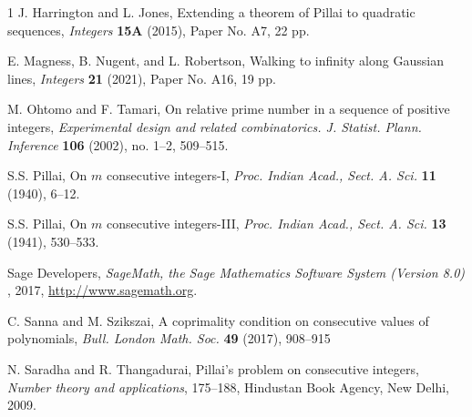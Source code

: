 \documentclass[11pt]{article}
\begin{document}
\begin{thebibliography}{1}
 J. Harrington and L. Jones, Extending a theorem of Pillai to quadratic sequences, {\em Integers} {\textbf{15A}} (2015), Paper No. A7, 22 pp.

 E. Magness, B. Nugent, and L. Robertson, 
Walking to infinity along Gaussian lines,
{\em Integers} {\textbf{21}} (2021), Paper No. A16, 19 pp.

 M. Ohtomo and F. Tamari, On relative prime number in a sequence of positive integers, {\em Experimental design and related combinatorics. J. Statist. Plann. Inference} {\textbf{106}} (2002), no. 1--2, 509--515.


 S.S. Pillai, On $m$ consecutive integers-I,
{\em Proc. Indian Acad., Sect. A.
Sci.} \textbf{11} (1940), 6--12.

 S.S. Pillai, On $m$ consecutive integers-III,
{\em Proc. Indian Acad., Sect. A.
Sci.} \textbf{13} (1941), 530--533.

 Sage Developers, {\textit{SageMath, the Sage Mathematics Software System (Version 8.0)}} , 2017, {\url{http://www.sagemath.org}}.

 C. Sanna and M. Szikszai, A coprimality condition on consecutive values of polynomials, {\em Bull. London Math. Soc.} \textbf{49}  (2017), 908--915

 N. Saradha and R. Thangadurai, Pillai's problem on consecutive integers, {\em Number theory and applications}, 175--188, Hindustan Book Agency, New Delhi, 2009.

\end{thebibliography}
\end{document}
